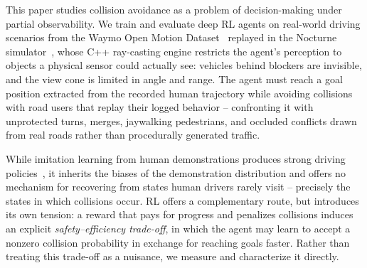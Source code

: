 \documentclass{article}
\begin{document}
This paper studies collision avoidance as a problem of decision-making
under partial observability. We train and evaluate deep RL agents
on real-world driving scenarios from the Waymo Open Motion
Dataset~\citep{ettinger2021waymo} replayed in the Nocturne
simulator~\citep{vinitsky2022nocturne}, whose C++ ray-casting engine
restricts the agent's perception to objects a physical sensor could actually
see: vehicles behind blockers are invisible, and the view cone is limited in
angle and range. The agent must reach a goal position extracted from the
recorded human trajectory while avoiding collisions with road users that
replay their logged behavior -- confronting it with unprotected turns,
merges, jaywalking pedestrians, and occluded conflicts drawn from real
roads rather than procedurally generated traffic.

While imitation learning from human demonstrations produces strong driving
policies~\citep{bansal2018chauffeurnet, codevilla2019exploring}, it inherits
the biases of the demonstration distribution and offers no mechanism for
recovering from states human drivers rarely visit -- precisely the states in
which collisions occur. RL offers a complementary route, but introduces its
own tension: a reward that pays for progress and penalizes collisions
induces an explicit \emph{safety--efficiency trade-off}, in which the agent
may learn to accept a nonzero collision probability in exchange for reaching
goals faster. Rather than treating this trade-off as a nuisance, we measure
and characterize it directly.
\end{document}
